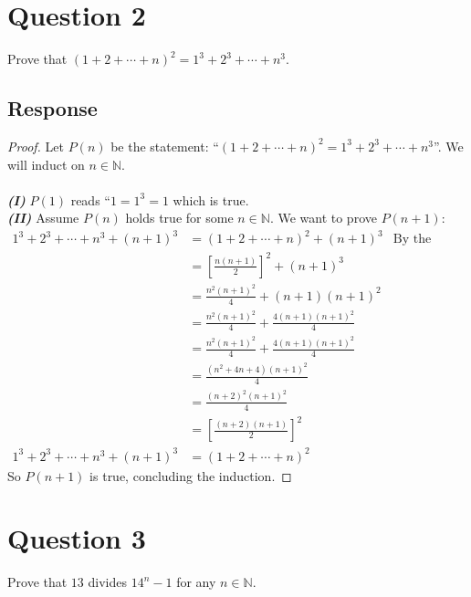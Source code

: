 \documentclass[13pt]{article}
\begin{document}
\newpage
\section*{Question 2}
Prove that $(1 + 2 + \cdots + n)^2 = 1^3 + 2^3 + \cdots + n^3$.

\subsection*{Response}
\begin{proof}
  Let $P(n)$ be the statement: ``$(1 + 2 + \cdots + n)^2 = 1^3 + 2^3 + \cdots + n^3$''. We will
  induct on $n \in \mathbb{N}$. \\ \\
  \textbf{\textit{(I)}} $P(1)$ reads ``$1 = 1^3 = 1$ which is true. \\
  \textbf{\textit{(II)}} Assume $P(n)$ holds true for some $n \in \mathbb{N}$. We want to prove $P(n + 1)$:
  \begin{align*}
    1^3 + 2^3 + \cdots + n^3 + (n + 1)^3 &= (1 + 2 + \cdots + n)^2 + (n + 1)^3 & \text{By the
                                                                               Inductive Hypothesis} \\
                                         &= \left[\frac{n(n + 1)}{2}\right]^2  + (n + 1)^3 \\
                                         &= \frac{n^2(n + 1)^2}{4} + (n + 1)(n + 1)^2 \\
                                         &= \frac{n^2(n + 1)^2}{4} + \frac{4(n + 1)(n + 1)^2}{4} \\
                                         &= \frac{n^2(n + 1)^2}{4} + \frac{4(n + 1)(n + 1)^2}{4} \\
                                         &= \frac{(n^2 + 4n + 4)(n + 1)^2}{4} \\
                                         &= \frac{(n + 2)^2(n + 1)^2}{4} \\
                                         &= \left[\frac{(n + 2)(n + 1)}{2}\right]^2 \\
    1^3 + 2^3 + \cdots + n^3 + (n + 1)^3 &= (1 + 2 + \cdots + n)^2
  \end{align*}
  So $P(n + 1)$ is true, concluding the induction.
\end{proof}





\newpage
\section*{Question 3}
Prove that $13$ divides $14^n - 1$ for any $n \in \mathbb{N}$.
\end{document}
